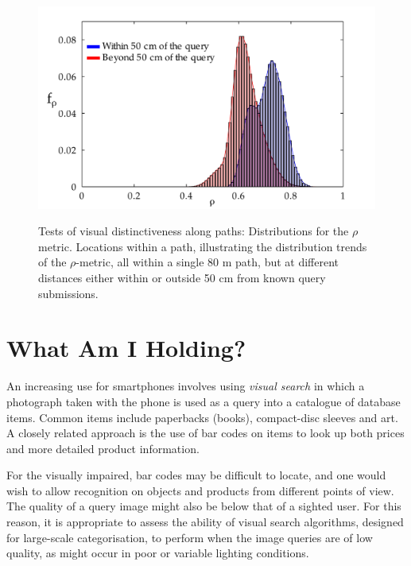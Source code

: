 \begin{figure}[ht]
\centering
{\includegraphics[width=\linewidth]{./gfx/Chapter02/C5distributions_no_smoothingWithSmoothedHistograms-latex.pdf}}
\caption{Tests of visual distinctiveness along paths: Distributions for the $\rho$ metric. Locations within a path, illustrating the distribution trends of the $\rho$-metric, all within a single 80 m path, but at different distances either within or outside 50 cm from known query submissions.}        
\label{fig:rhoDistribution}
\end{figure}



\section{What Am I Holding?}

An increasing use for smartphones involves using \textit{visual search} in which a photograph taken with the phone is used as a query into a catalogue of database items.  Common items include paperbacks (books), compact-disc sleeves and art.  A closely related approach is the use of bar codes on items to look up both prices and more detailed product information.  

For the visually impaired, bar codes may be difficult to locate, and one would wish to allow recognition on objects and products from different points of view. The quality of a query image might also be below that of a sighted user.  For this reason, it is appropriate to assess the ability of visual search algorithms, designed for large-scale categorisation, to perform when the image queries are of low quality, as might occur in poor or variable lighting conditions.

